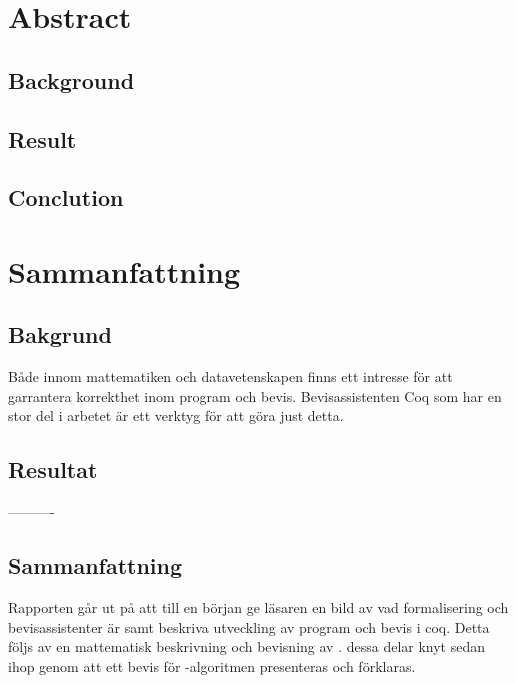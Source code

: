 \section{Abstract}

\subsection{Background}

\subsection{Result}

\subsection{Conclution}



\section{Sammanfattning}

\subsection{Bakgrund}
Både innom mattematiken och datavetenskapen finns ett intresse
för att garrantera korrekthet inom program och bevis.
Bevisassistenten Coq som har en stor del i arbetet är ett
verktyg för att göra just detta.

\subsection{Resultat}


----------


\subsection{Sammanfattning}
Rapporten går ut på att till en början ge läsaren en bild av vad
formalisering och bevisassistenter är samt beskriva utveckling av program
och bevis i coq. Detta följs av en mattematisk beskrivning
och bevisning av \toom. dessa delar knyt sedan ihop genom att
ett bevis för \toom -algoritmen presenteras och förklaras.
